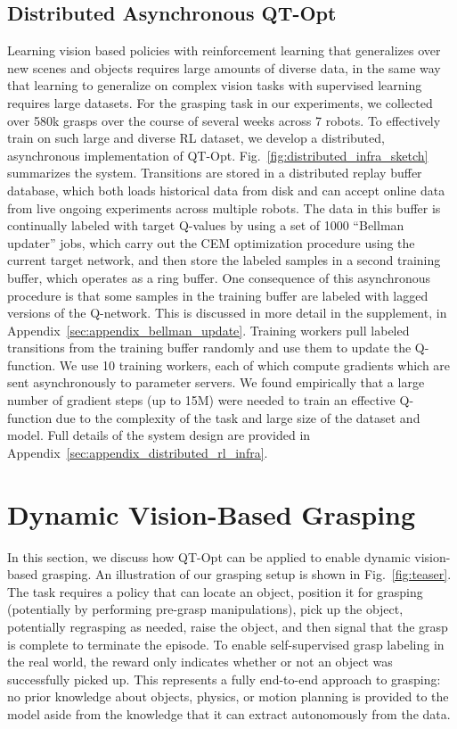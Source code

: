 \documentclass{article}
\newcommand{\numgrasps}{{580k}} %
\begin{document}
\subsection{Distributed Asynchronous QT-Opt}
\label{sec:rl_system}

Learning vision based policies with reinforcement learning that generalizes over new scenes and objects requires large amounts of diverse data, in the same way that learning to generalize on complex vision tasks with supervised learning requires large datasets. For the grasping task in our experiments, we collected over \numgrasps{} grasps over the course of several weeks across 7 robots. To effectively train on such large and diverse RL dataset, we develop a distributed, asynchronous implementation of QT-Opt. Fig.~\ref{fig:distributed_infra_sketch} summarizes the system.
Transitions are stored in a distributed replay buffer database, which both loads historical data from disk and can accept online data from live ongoing experiments across multiple robots. The data in this buffer is continually labeled with target Q-values by using a set of 1000 ``Bellman updater'' jobs, which carry out the CEM optimization procedure using the current target network, and then store the labeled samples in a second training buffer, which operates as a ring buffer. One consequence of this asynchronous procedure is that some samples in the training buffer are labeled with lagged versions of the Q-network. This is discussed in more detail in the supplement, in Appendix~\ref{sec:appendix_bellman_update}. Training workers pull labeled transitions from the training buffer randomly and use them to update the Q-function. We use 10 training workers, each of which compute gradients which are sent asynchronously to parameter servers. We found empirically that a large number of gradient steps (up to 15M) were needed to train an effective Q-function due to the complexity of the task and large size of the dataset and model. Full details of the system design are provided in Appendix~\ref{sec:appendix_distributed_rl_infra}.


\section{Dynamic Vision-Based Grasping}
\label{sec:grasping_system}

In this section, we discuss how QT-Opt can be applied to enable dynamic vision-based grasping. An illustration of our grasping setup is shown in Fig.~\ref{fig:teaser}. The task requires a policy that can locate an object, position it for grasping (potentially by performing pre-grasp manipulations), pick up the object, potentially regrasping as needed, raise the object, and then signal that the grasp is complete to terminate the episode. To
enable self-supervised grasp labeling
in the real world, the reward only indicates whether or not an object was successfully picked up. This represents a fully end-to-end approach to grasping: no prior knowledge about objects, physics, or motion planning is provided to the model aside from the knowledge that it can extract autonomously from the data.
\end{document}
